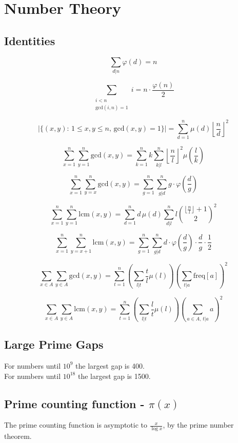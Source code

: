 \section{Number Theory}

\subsection{Identities}

$$ \sum_{d|n} \varphi(d) = n$$

$$ \sum_{\substack{i < n \\ \text{gcd}(i, n) = 1}} i = n \cdot \frac{\varphi(n)}{2} $$

$$ |\{(x, y) : \, 1 \leq x, y \leq n, \, \text{gcd}(x, y) = 1\}| = \sum_{d = 1}^n \mu(d) \left \lfloor \frac{n}{d} \right \rfloor^2$$

$$\sum_{x = 1}^n \sum_{y = 1}^n \text{gcd}(x, y)
= \sum_{k = 1}^n k \sum_{k|l}^{n} \left \lfloor \frac{n}{l} \right \rfloor^2 \mu\left(\frac{l}{k}\right)$$

$$\sum_{x = 1}^n \sum_{y = x}^n \text{gcd}(x, y) = \sum_{g = 1}^n \sum_{g|d}^n g \cdot \varphi\left(\frac{d}{g}\right)$$

$$\sum_{x = 1}^n \sum_{y = 1}^n \text{lcm}(x, y)
= \sum_{d = 1}^n d \, \mu(d) \sum_{d|l}^{n} l \binom{\lfloor \frac{n}{l} \rfloor + 1}{2}^2$$

$$\sum_{x = 1}^n \sum_{y = x+1}^n \text{lcm}(x, y) = \sum_{g = 1}^n \sum_{g|d}^n d \cdot \varphi\left(\frac{d}{g}\right) \cdot \frac{d}{g} \cdot \frac 1 2$$

$$\sum_{x \in A} \sum_{y \in A} \text{gcd}(x, y)
= \sum_{t = 1}^n \left(\sum_{l | t} \frac{t}{l} \mu(l)\right) \left(\sum_{t|a} \text{freq}[a]\right)^2$$

$$\sum_{x \in A} \sum_{y \in A} \text{lcm}(x, y)
= \sum_{t = 1}^n \left(\sum_{l | t} \frac{l}{t} \mu(l)\right) \left(\sum_{a \in A, \, t|a} a\right)^2$$

\subsection{Large Prime Gaps}
For numbers until $10^9$ the largest gap is 400.\\
For numbers until $10^{18}$ the largest gap is 1500.\\[0.5cm]

\subsection{Prime counting function - \texorpdfstring{$\pi(x)$}{}} The prime counting function is asymptotic to $\frac{x}{\log x}$, by the prime number theorem.

